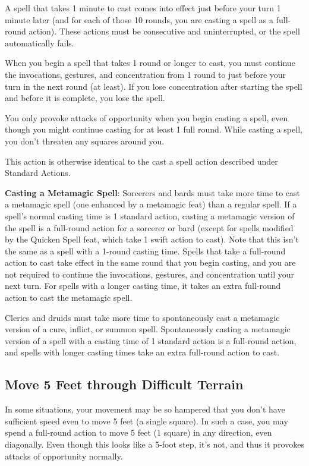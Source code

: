 A spell that takes 1 minute to cast comes into effect just before your turn 1 minute later (and for each of those 10 rounds, you are casting a spell as a full-round action). These actions must be consecutive and uninterrupted, or the spell automatically fails.
				
When you begin a spell that takes 1 round or longer to cast, you must continue the invocations, gestures, and concentration from 1 round to just before your turn in the next round (at least). If you lose concentration after starting the spell and before it is complete, you lose the spell.
				
You only provoke attacks of opportunity when you begin casting a spell, even though you might continue casting for at least 1 full round. While casting a spell, you don't threaten any squares around you.
				
This action is otherwise identical to the cast a spell action described under Standard Actions.
				
\textbf{Casting a Metamagic Spell}: Sorcerers and bards must take more time to cast a metamagic spell (one enhanced by a metamagic feat) than a regular spell. If a spell's normal casting time is 1 standard action, casting a metamagic version of the spell is a full-round action for a sorcerer or bard (except for spells modified by the Quicken Spell feat, which take 1 swift action to cast). Note that this isn't the same as a spell with a 1-round casting time. Spells that take a full-round action to cast take effect in the same round that you begin casting, and you are not required to continue the invocations, gestures, and concentration until your next turn. For spells with a longer casting time, it takes an extra full-round action to cast the metamagic spell.
				
Clerics and druids must take more time to spontaneously cast a metamagic version of a cure, inflict, or summon spell. Spontaneously casting a metamagic version of a spell with a casting time of 1 standard action is a full-round action, and spells with longer casting times take an extra full-round action to cast.
				
\subsection{Move 5 Feet through Difficult Terrain}

				
In some situations, your movement may be so hampered that you don't have sufficient speed even to move 5 feet (a single square). In such a case, you may spend a full-round action to move 5 feet (1 square) in any direction, even diagonally. Even though this looks like a 5-foot step, it's not, and thus it provokes attacks of opportunity normally.
				
